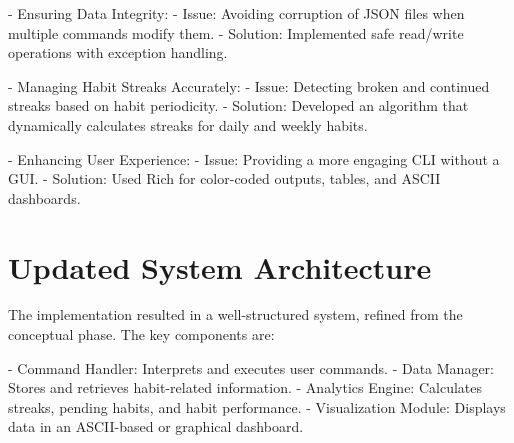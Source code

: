 \documentclass[a4paper,12pt]{article}
\begin{document}
- Ensuring Data Integrity:  
  - Issue: Avoiding corruption of JSON files when multiple commands modify them.  
  - Solution: Implemented safe read/write operations with exception handling.

- Managing Habit Streaks Accurately:  
  - Issue: Detecting broken and continued streaks based on habit periodicity.  
  - Solution: Developed an algorithm that dynamically calculates streaks for daily and weekly habits.

- Enhancing User Experience:  
  - Issue: Providing a more engaging CLI without a GUI.  
  - Solution: Used Rich for color-coded outputs, tables, and ASCII dashboards.

\section{Updated System Architecture}
The implementation resulted in a well-structured system, refined from the conceptual phase. The key components are:

- Command Handler: Interprets and executes user commands.
- Data Manager: Stores and retrieves habit-related information.
- Analytics Engine: Calculates streaks, pending habits, and habit performance.
- Visualization Module: Displays data in an ASCII-based or graphical dashboard.
\end{document}
